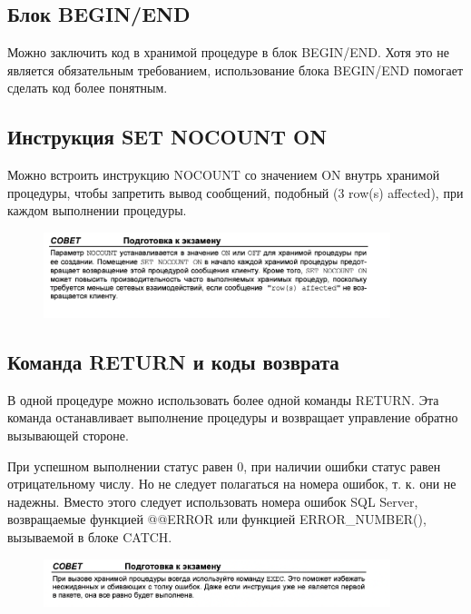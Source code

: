\subsection{Блок BEGIN/END}
Можно заключить код в хранимой процедуре в блок BEGIN/END. Хотя это не является обязательным требованием, использование блока BEGIN/END помогает сделать код
более понятным. 

\subsection{Инструкция SET NOCOUNT ON}
Можно встроить инструкцию NOCOUNT со значением ON внутрь хранимой процедуры,
чтобы запретить вывод сообщений, подобный (3 row(s) affected), при каждом
выполнении процедуры. 

\begin{figure}[h!]
	\begin{center}
		\includegraphics[width=0.9\textwidth]{img/advice32.png}
	\end{center}
	\captionsetup{justification=centering}
\end{figure}

\subsection{Команда RETURN и коды возврата}

В одной процедуре можно использовать более одной команды RETURN. Эта команда
останавливает выполнение процедуры и возвращает управление обратно вызывающей стороне.

При успешном выполнении статус равен 0, при наличии
ошибки статус равен отрицательному числу. Но не следует полагаться на номера
ошибок, т. к. они не надежны. Вместо этого следует использовать номера ошибок
SQL Server, возвращаемые функцией @@ERROR или функцией ERROR\_NUMBER(), вызываемой в блоке CATCH. 


\begin{figure}[h!]
	\begin{center}
		\includegraphics[width=0.9\textwidth]{img/advice33.png}
	\end{center}
	\captionsetup{justification=centering}
\end{figure}


